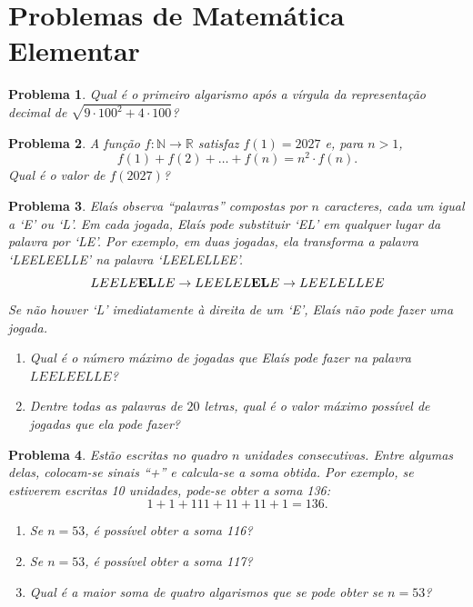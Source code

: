 \documentclass{hipatia}
\newtheorem{problem*}{Problema}
\begin{document}
\section*{Problemas de Matemática Elementar}

\begin{problem*}
Qual é o primeiro algarismo após a vírgula da representação decimal de $\sqrt{9 \cdot 100^2 + 4 \cdot 100}$?
\end{problem*}


\begin{problem*}
A função $f: \mathbb{N} \rightarrow \mathbb{R}$ satisfaz $f(1) = 2027$ e, para $n > 1$, $$f(1) + f(2) + \ldots + f(n) = n^2 \cdot f(n).$$ Qual é o valor de $f(2027)$?

\end{problem*}



\begin{problem*}
Elaís observa ``palavras'' compostas por \( n \) caracteres, cada um igual a `E' ou `L'.  
Em cada jogada, Elaís pode substituir `EL' em qualquer lugar da palavra por `LE'. Por exemplo, em duas jogadas, ela transforma a palavra `LEELEELLE' na palavra `LEELELLEE'. 
$$LEELE{\bf EL}LE \rightarrow LEELEL{\bf EL}E \rightarrow LEELELLEE$$
\noindent Se não houver `L' imediatamente à direita de um `E', Elaís não pode fazer uma jogada.
\begin{enumerate}
\item[a)] Qual é o número máximo de jogadas que Elaís pode fazer na palavra $LEELEELLE$?

\item[b)] Dentre todas as palavras de $20$ letras, qual é o valor máximo possível de jogadas que ela pode fazer?
\end{enumerate}
\end{problem*}

\begin{problem*}
Estão escritas no quadro \( n \) unidades consecutivas. Entre algumas delas, colocam-se sinais ``+'' e calcula-se a soma obtida. Por exemplo, se estiverem escritas 10 unidades, pode-se obter a soma 136:
\[
1 + 1 + 111 + 11 + 11 + 1 = 136.
\]

\begin{enumerate}
    \item[a)] Se \( n = 53 \), é possível obter a soma 116?  
    \item[b)] Se \( n = 53 \), é possível obter a soma 117?  
    \item[c)] Qual é a maior soma de quatro algarismos que se pode obter se \( n = 53 \)?
\end{enumerate}
\end{problem*}
\end{document}

